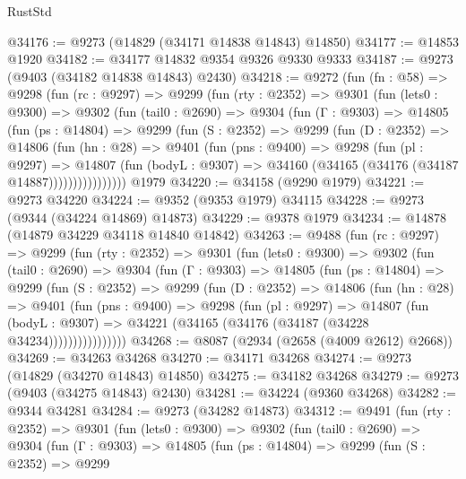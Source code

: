 \begin{lexlean}{RustStd}
\begin{coremodule}
@34176 := @9273 (@14829 (@34171 @14838 @14843) @14850)
@34177 := @14853 @1920
@34182 := @34177 @14832 @9354 @9326 @9330 @9333
@34187 := @9273 (@9403 (@34182 @14838 @14843) @2430)
@34218 := @9272
    (fun (fn : @58) =>
    @9298
      (fun (rc : @9297) =>
      @9299
        (fun (rty : @2352) =>
        @9301
          (fun (lets0 : @9300) =>
          @9302
            (fun (tail0 : @2690) =>
            @9304
              (fun (Γ : @9303) =>
              @14805
                (fun (ps : @14804) =>
                @9299
                  (fun (S : @2352) =>
                  @9299
                    (fun (D : @2352) =>
                    @14806
                      (fun (hn : @28) =>
                      @9401
                        (fun (pns : @9400) =>
                        @9298
                          (fun (pl : @9297) =>
                          @14807
                            (fun (bodyL : @9307) =>
                            @34160 (@34165 (@34176 (@34187 @14887))))))))))))))))
    @1979
@34220 := @34158 (@9290 @1979)
@34221 := @9273 @34220
@34224 := @9352 (@9353 @1979) @34115
@34228 := @9273 (@9344 (@34224 @14869) @14873)
@34229 := @9378 @1979
@34234 := @14878 (@14879 @34229 @34118 @14840 @14842)
@34263 := @9488
    (fun (rc : @9297) =>
    @9299
      (fun (rty : @2352) =>
      @9301
        (fun (lets0 : @9300) =>
        @9302
          (fun (tail0 : @2690) =>
          @9304
            (fun (Γ : @9303) =>
            @14805
              (fun (ps : @14804) =>
              @9299
                (fun (S : @2352) =>
                @9299
                  (fun (D : @2352) =>
                  @14806
                    (fun (hn : @28) =>
                    @9401
                      (fun (pns : @9400) =>
                      @9298
                        (fun (pl : @9297) =>
                        @14807
                          (fun (bodyL : @9307) =>
                          @34221 (@34165 (@34176 (@34187 (@34228 @34234))))))))))))))))
@34268 := @8087 (@2934 (@2658 (@4009 @2612) @2668))
@34269 := @34263 @34268
@34270 := @34171 @34268
@34274 := @9273 (@14829 (@34270 @14843) @14850)
@34275 := @34182 @34268
@34279 := @9273 (@9403 (@34275 @14843) @2430)
@34281 := @34224 (@9360 @34268)
@34282 := @9344 @34281
@34284 := @9273 (@34282 @14873)
@34312 := @9491
    (fun (rty : @2352) =>
    @9301
      (fun (lets0 : @9300) =>
      @9302
        (fun (tail0 : @2690) =>
        @9304
          (fun (Γ : @9303) =>
          @14805
            (fun (ps : @14804) =>
            @9299
              (fun (S : @2352) =>
              @9299

\end{coremodule}
\end{lexlean}
